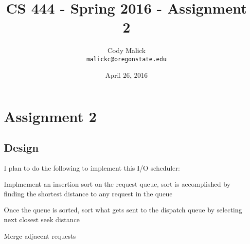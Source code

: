 \documentclass[10pt,letterpaper]{article}
\begin{document}
\begin{titlepage}
  \title{CS 444 - Spring 2016 - Assignment 2}
  \author{Cody Malick\\
  \texttt{malickc@oregonstate.edu}}
  \date{April 26, 2016}
  \maketitle
  \vspace*{2cm}
  \begin{abstract}
      \noindent   \end{abstract}

\end{titlepage}

\tableofcontents
\clearpage

\section{Assignment 2}
  \subsection{Design}
I plan to do the following to implement this I/O scheduler:
\begin{description}
	\item Implmement an insertion sort on the request queue, sort is
		accomplished by finding the shortest distance to any request in
		the queue
	\item Once the queue is sorted, sort what gets sent to the dispatch
		queue by selecting next closest seek distance
	\item Merge adjacent requests

\end{description}
\end{document}
